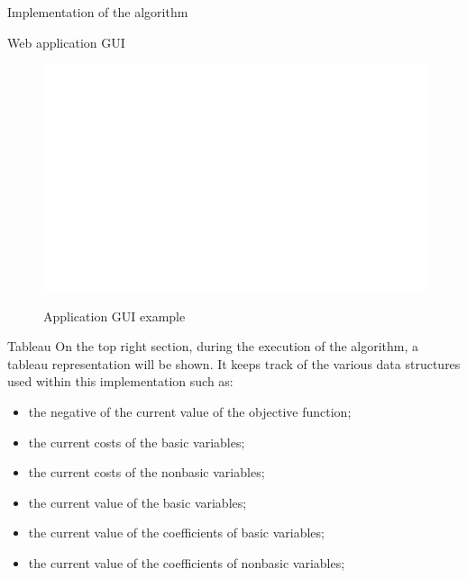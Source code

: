 \documentclass[9pt]{extarticle}
\begin{document}
\begin{section}{Implementation of the algorithm}
\begin{subsection}{Web application GUI}
            \begin{figure}[h]
                \includegraphics[scale=0.3]{gui2.png}
                \centering
                \begin{description}
                    \centering
                    \item[Figure 4] Application GUI example
                \end{description}
            \end{figure}

            \begin{subsubsection}{Tableau}
                On the top right section, during the execution of the algorithm, a tableau representation will be shown.
                It keeps track of the various data structures used within this implementation such as:
                \begin{itemize}
                    \item the negative of the current value of the objective function;
                    \item the current costs of the basic variables;
                    \item the current costs of the nonbasic variables;
                    \item the current value of the basic variables;
                    \item the current value of the coefficients of basic variables;
                    \item the current value of the coefficients of nonbasic variables;
                \end{itemize}
                

\end{subsubsection}
\end{subsection}
\end{section}
\end{document}
